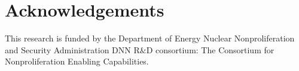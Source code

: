 \documentclass{anstrans}
\begin{document}
\section{Acknowledgements}

This research is funded by the Department of Energy Nuclear Nonproliferation and Security Administration DNN R$\&$D consortium: The Consortium for Nonproliferation Enabling Capabilities. 



\end{document}
